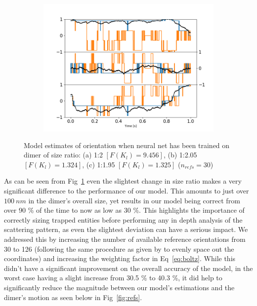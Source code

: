 \documentclass[final,  3p]{elsarticle}
\begin{document}
\begin{figure}[h]
\begin{subfigure}{0.31\textwidth}
		\includegraphics[width=\textwidth]{./Images/fig8c.png}
	\end{subfigure}
	\caption{Model estimates of orientation when neural net has been trained on dimer of size ratio: (a) 1:2 $[F(K_l)=9.456]$, (b) 1:2.05 $[F(K_l)=1.324]$, (c) 1:1.95 $[F(K_l)=1.325]$ ($n_{refs} = 30$)}
	\label{fig:size}
\end{figure}
As can be seen from Fig~\ref{fig:size}  even the slightest change in size ratio makes a very significant difference to the performance of our model. This amounts to just over $100 \ nm$ in the dimer's overall size, yet results in our model being correct from over 90 \% of the time to now as low as 30 \%. This highlights the importance of correctly sizing trapped entities before performing any in depth analysis of the scattering pattern, as even the slightest deviation can have a serious impact. We addressed this by increasing the number of available reference orientations from 30 to 126 (following the same procedure as given by \cite{Rey2006} to evenly space out the coordinates) and increasing the weighting factor in Eq~\ref{eq:boltz}. While this didn't have a significant improvement on the overall accuracy of the model, in the worst case having a slight increase from 30.5 \% to 40.3 \%, it did help to significantly reduce the magnitude between our model's estimations and the dimer's motion as seen below in Fig~\ref{fig:refs}.
\end{document}
